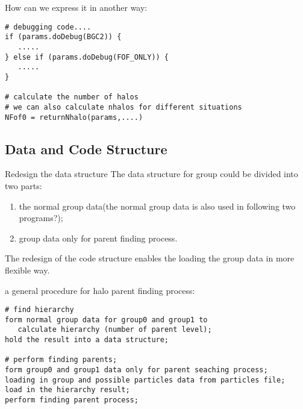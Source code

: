\documentclass[notheorems, aspectratio=54]{beamer}
\begin{document}
\begin{frame}[fragile]

How can we express it in another way:
\begin{verbatim}
# debugging code....
if (params.doDebug(BGC2)) {
   .....
} else if (params.doDebug(FOF_ONLY)) {
   .....
}

# calculate the number of halos
# we can also calculate nhalos for different situations
NFof0 = returnNhalo(params,....)
\end{verbatim}

\end{frame}


\subsection{Data and Code Structure}
\begin{frame}

\begin{block}{Redesign the data structure}
The data structure for group could be divided into two parts:
 \begin{enumerate}
  \item the normal group data(the normal group data is also used in following two programs?);
  \item group data only for parent finding process.
 \end{enumerate}
 The redesign of the code structure enables the loading the group data in more flexible way. 
\end{block}

\end{frame}

\begin{frame}[fragile]

a general procedure for halo parent finding process:
\begin{verbatim}
# find hierarchy
form normal group data for group0 and group1 to 
   calculate hierarchy (number of parent level);
hold the result into a data structure;

# perform finding parents;
form group0 and group1 data only for parent seaching process;
loading in group and possible particles data from particles file;
load in the hierarchy result;
perform finding parent process;
\end{verbatim}

\end{frame}
\end{document}
